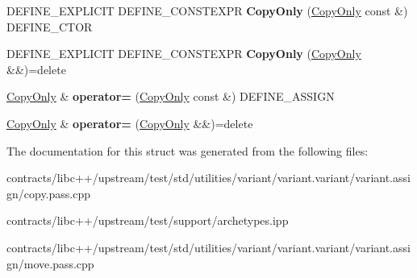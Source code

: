 \begin{DoxyCompactItemize}
\mbox{\label{struct_copy_only_abc3276292d2d63651f591cca3d5af0ff}} 
D\+E\+F\+I\+N\+E\+\_\+\+E\+X\+P\+L\+I\+C\+IT D\+E\+F\+I\+N\+E\+\_\+\+C\+O\+N\+S\+T\+E\+X\+PR {\bfseries Copy\+Only} (\mbox{\hyperlink{struct_copy_only}{Copy\+Only}} const \&) D\+E\+F\+I\+N\+E\+\_\+\+C\+T\+OR
\item 
\mbox{\label{struct_copy_only_a40786e8ae3d2fbc2ecc40c408a7b5ea1}} 
D\+E\+F\+I\+N\+E\+\_\+\+E\+X\+P\+L\+I\+C\+IT D\+E\+F\+I\+N\+E\+\_\+\+C\+O\+N\+S\+T\+E\+X\+PR {\bfseries Copy\+Only} (\mbox{\hyperlink{struct_copy_only}{Copy\+Only}} \&\&)=delete
\item 
\mbox{\label{struct_copy_only_ae29db476c009a6bd0acfb5e9cc5c8faf}} 
\mbox{\hyperlink{struct_copy_only}{Copy\+Only}} \& {\bfseries operator=} (\mbox{\hyperlink{struct_copy_only}{Copy\+Only}} const \&) D\+E\+F\+I\+N\+E\+\_\+\+A\+S\+S\+I\+GN
\item 
\mbox{\label{struct_copy_only_a25c8de0929522c29b37e6359f2d2bdb9}} 
\mbox{\hyperlink{struct_copy_only}{Copy\+Only}} \& {\bfseries operator=} (\mbox{\hyperlink{struct_copy_only}{Copy\+Only}} \&\&)=delete
\end{DoxyCompactItemize}


The documentation for this struct was generated from the following files\+:\begin{DoxyCompactItemize}
\item 
contracts/libc++/upstream/test/std/utilities/variant/variant.\+variant/variant.\+assign/copy.\+pass.\+cpp\item 
contracts/libc++/upstream/test/support/archetypes.\+ipp\item 
contracts/libc++/upstream/test/std/utilities/variant/variant.\+variant/variant.\+assign/move.\+pass.\+cpp\end{DoxyCompactItemize}
